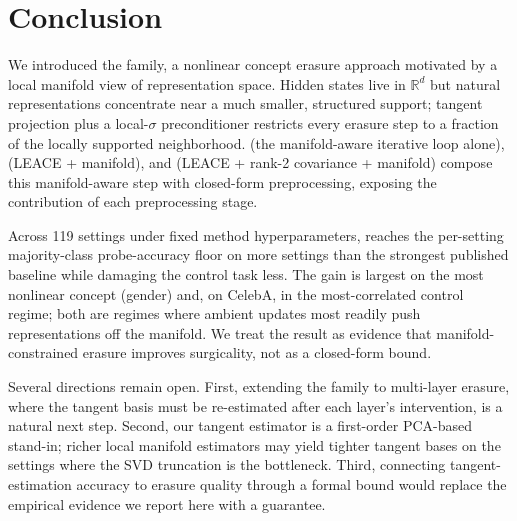 \section{Conclusion}

We introduced the \TanGCE{} family, a nonlinear concept erasure approach motivated by a local manifold view of representation space. Hidden states live in $\mathbb{R}^d$ but natural representations concentrate near a much smaller, structured support; tangent projection plus a local-$\sigma$ preconditioner restricts every erasure step to a fraction of the locally supported neighborhood. \TanGCE{} (the manifold-aware iterative loop alone), \TanGCEp{} (LEACE + manifold), and \TanGCEpp{} (LEACE + rank-2 covariance + manifold) compose this manifold-aware step with closed-form preprocessing, exposing the contribution of each preprocessing stage.

Across 119 settings under fixed method hyperparameters, \TanGCEpp{} reaches the per-setting majority-class probe-accuracy floor on more settings than the strongest published baseline while damaging the control task less. The gain is largest on the most nonlinear concept (gender) and, on CelebA, in the most-correlated control regime; both are regimes where ambient updates most readily push representations off the manifold. We treat the result as evidence that manifold-constrained erasure improves surgicality, not as a closed-form bound.

Several directions remain open. First, extending the \TanGCE{} family to multi-layer erasure, where the tangent basis must be re-estimated after each layer's intervention, is a natural next step. Second, our tangent estimator is a first-order PCA-based stand-in; richer local manifold estimators may yield tighter tangent bases on the settings where the SVD truncation is the bottleneck. Third, connecting tangent-estimation accuracy to erasure quality through a formal bound would replace the empirical evidence we report here with a guarantee.

